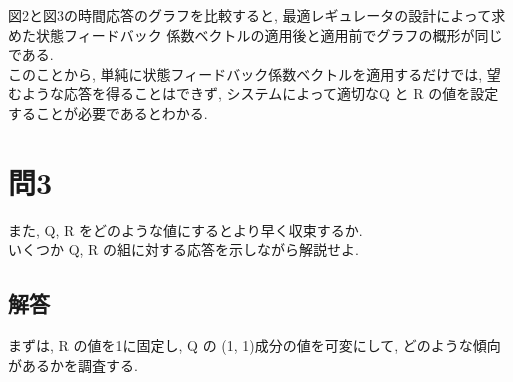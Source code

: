 \documentclass{jsarticle}
\begin{document}
図2と図3の時間応答のグラフを比較すると, 最適レギュレータの設計によって求めた状態フィードバック
\hspace*{1zw}係数ベクトルの適用後と適用前でグラフの概形が同じである.\\

このことから, 単純に状態フィードバック係数ベクトルを適用するだけでは, 望むような応答を得ることは\hspace*{1zw}できず, 
システムによって適切なQ と R の値を設定することが必要であるとわかる.

\section*{問3}
また, Q, R をどのような値にするとより早く収束するか.\\
\hspace*{1zw}いくつか Q, R の組に対する応答を示しながら解説せよ.\\

\vspace*{2mm}\subsection*{解答}
まずは, R の値を1に固定し, Q の (1, 1)成分の値を可変にして, どのような傾向があるかを調査する.
\end{document}
